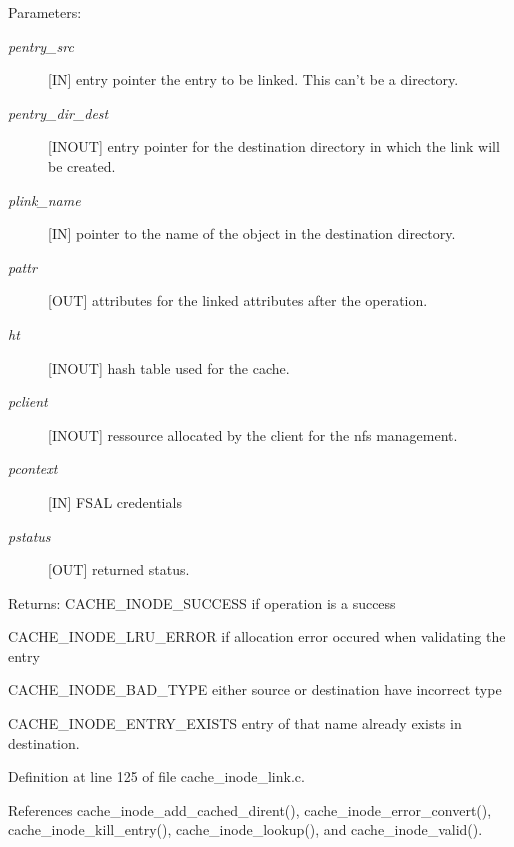 \begin{Desc}
\item[Parameters:]
\begin{description}
\item[{\em pentry\_\-src}][IN] entry pointer the entry to be linked. This can't be a directory. \item[{\em pentry\_\-dir\_\-dest}][INOUT] entry pointer for the destination directory in which the link will be created. \item[{\em plink\_\-name}][IN] pointer to the name of the object in the destination directory. \item[{\em pattr}][OUT] attributes for the linked attributes after the operation. \item[{\em ht}][INOUT] hash table used for the cache. \item[{\em pclient}][INOUT] ressource allocated by the client for the nfs management. \item[{\em pcontext}][IN] FSAL credentials \item[{\em pstatus}][OUT] returned status.\end{description}
\end{Desc}
\begin{Desc}
\item[Returns:]CACHE\_\-INODE\_\-SUCCESS if operation is a success \par
 

CACHE\_\-INODE\_\-LRU\_\-ERROR if allocation error occured when validating the entry\par
 

CACHE\_\-INODE\_\-BAD\_\-TYPE either source or destination have incorrect type\par
 

CACHE\_\-INODE\_\-ENTRY\_\-EXISTS entry of that name already exists in destination. \end{Desc}


Definition at line 125 of file cache\_\-inode\_\-link.c.

References cache\_\-inode\_\-add\_\-cached\_\-dirent(), cache\_\-inode\_\-error\_\-convert(), cache\_\-inode\_\-kill\_\-entry(), cache\_\-inode\_\-lookup(), and cache\_\-inode\_\-valid().
